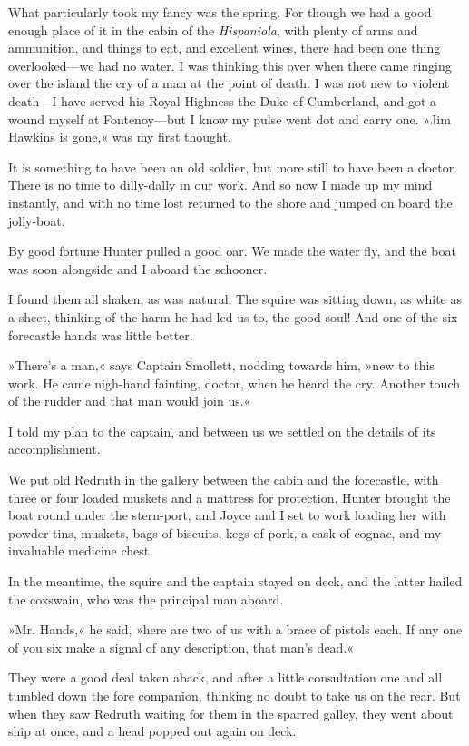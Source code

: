 What particularly took my fancy was the spring. For though we had a good enough place of it in the cabin of the \textit{Hispaniola}, with plenty of arms and ammunition, and things to eat, and excellent wines, there had been one thing overlooked—we had no water. I was thinking this over when there came ringing over the island the cry of a man at the point of death. I was not new to violent death—I have served his Royal Highness the Duke of Cumberland, and got a wound myself at Fontenoy—but I know my pulse went dot and carry one. »Jim Hawkins is gone,« was my first thought.

It is something to have been an old soldier, but more still to have been a doctor. There is no time to dilly-dally in our work. And so now I made up my mind instantly, and with no time lost returned to the shore and jumped on board the jolly-boat.

By good fortune Hunter pulled a good oar. We made the water fly, and the boat was soon alongside and I aboard the schooner.

I found them all shaken, as was natural. The squire was sitting down, as white as a sheet, thinking of the harm he had led us to, the good soul! And one of the six forecastle hands was little better.

»There's a man,« says Captain Smollett, nodding towards him, »new to this work. He came nigh-hand fainting, doctor, when he heard the cry. Another touch of the rudder and that man would join us.«

I told my plan to the captain, and between us we settled on the details of its accomplishment.

We put old Redruth in the gallery between the cabin and the forecastle, with three or four loaded muskets and a mattress for protection. Hunter brought the boat round under the stern-port, and Joyce and I set to work loading her with powder tins, muskets, bags of biscuits, kegs of pork, a cask of cognac, and my invaluable medicine chest.

In the meantime, the squire and the captain stayed on deck, and the latter hailed the coxswain, who was the principal man aboard.

»Mr. Hands,« he said, »here are two of us with a brace of pistols each. If any one of you six make a signal of any description, that man's dead.«

They were a good deal taken aback, and after a little consultation one and all tumbled down the fore companion, thinking no doubt to take us on the rear. But when they saw Redruth waiting for them in the sparred galley, they went about ship at once, and a head popped out again on deck.

